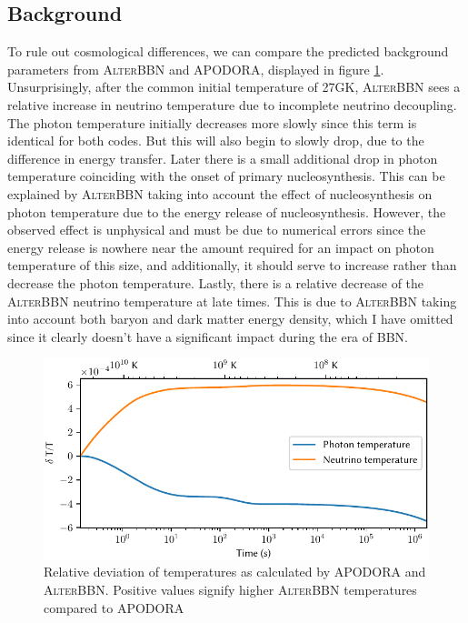 \subsection{Background}
\label{sec:AlterBackground}
To rule out cosmological differences, we can compare the predicted background parameters from \textsc{AlterBBN} and APODORA, displayed in figure \ref{fig:comparetemp}. Unsurprisingly, after the common initial temperature of 27GK, \textsc{AlterBBN} sees a relative increase in neutrino temperature due to incomplete neutrino decoupling. The photon temperature initially decreases more slowly since this term is identical for both codes. But this will also begin to slowly drop, due to the difference in energy transfer. Later there is a small additional drop in photon temperature coinciding with the onset of primary nucleosynthesis. This can be explained by \textsc{AlterBBN} taking into account the effect of nucleosynthesis on photon temperature due to the energy release of nucleosynthesis. However, the observed effect is unphysical and must be due to numerical errors since the energy release is nowhere near the amount required for an impact on photon temperature of this size, and additionally, it should serve to increase rather than decrease the photon temperature. Lastly, there is a relative decrease of the \textsc{AlterBBN} neutrino temperature at late times. This is due to \textsc{AlterBBN} taking into account both baryon and dark matter energy density, which I have omitted since it clearly doesn't have a significant impact during the era of BBN.
\begin{figure}[ht]
    \includegraphics[width=5.1in]{figures/comparetemp.pdf}
    \caption{Relative deviation of temperatures as calculated by APODORA and \textsc{AlterBBN}. Positive values signify higher \textsc{AlterBBN} temperatures compared to APODORA}
    \label{fig:comparetemp}
\end{figure}


